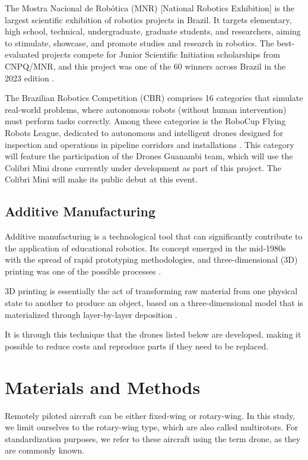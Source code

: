 \documentclass[conference]{IEEEtran}
\begin{document}
The Mostra Nacional de Robótica (MNR) [National Robotics Exhibition] is the largest scientific exhibition of robotics projects in Brazil. It targets elementary, high school, technical, undergraduate, graduate students, and researchers, aiming to stimulate, showcase, and promote studies and research in robotics. The best-evaluated projects compete for Junior Scientific Initiation scholarships from CNPQ/MNR, and this project was one of the 60 winners across Brazil in the 2023 edition \cite{b5}.

The Brazilian Robotics Competition (CBR) comprises 16 categories that simulate real-world problems, where autonomous robots (without human intervention) must perform tasks correctly. Among these categories is the RoboCup Flying Robots League, dedicated to autonomous and intelligent drones designed for inspection and operations in pipeline corridors and installations \cite{b3}. This category will feature the participation of the Drones Guanambi team, which will use the Colibri Mini drone currently under development as part of this project. The Colibri Mini will make its public debut at this event.

\subsection{Additive Manufacturing}

Additive manufacturing is a technological tool that can significantly contribute to the application of educational robotics. Its concept emerged in the mid-1980s with the spread of rapid prototyping methodologies, and three-dimensional (3D) printing was one of the possible processes \cite{b10}.

3D printing is essentially the act of transforming raw material from one physical state to another to produce an object, based on a three-dimensional model that is materialized through layer-by-layer deposition \cite{b8}.

It is through this technique that the drones listed below are developed, making it possible to reduce costs and reproduce parts if they need to be replaced.

\section{Materials and Methods}

Remotely piloted aircraft can be either fixed-wing or rotary-wing. In this study, we limit ourselves to the rotary-wing type, which are also called multirotors. For standardization purposes, we refer to these aircraft using the term drone, as they are commonly known.
\end{document}
